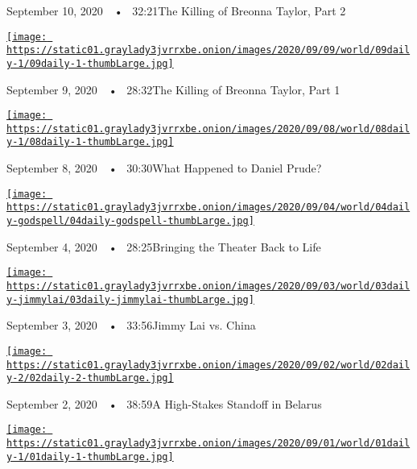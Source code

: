 September 10, 2020~~•~ 32:21The Killing of Breonna Taylor, Part 2

\href{https://www.nytimes3xbfgragh.onion/2020/09/09/podcasts/the-daily/breonna-taylor.html?action=click\&module=audio-series-bar\&region=header\&pgtype=Article}{\texttt{[image: https://static01.graylady3jvrrxbe.onion/images/2020/09/09/world/09daily-1/09daily-1-thumbLarge.jpg]}}

September 9, 2020~~•~ 28:32The Killing of Breonna Taylor, Part 1

\href{https://www.nytimes3xbfgragh.onion/2020/09/08/podcasts/the-daily/Daniel-Prude-BLM-police.html?action=click\&module=audio-series-bar\&region=header\&pgtype=Article}{\texttt{[image: https://static01.graylady3jvrrxbe.onion/images/2020/09/08/world/08daily-1/08daily-1-thumbLarge.jpg]}}

September 8, 2020~~•~ 30:30What Happened to Daniel Prude?

\href{https://www.nytimes3xbfgragh.onion/2020/09/04/podcasts/the-daily/Godspell-theater-coronavirus.html?action=click\&module=audio-series-bar\&region=header\&pgtype=Article}{\texttt{[image: https://static01.graylady3jvrrxbe.onion/images/2020/09/04/world/04daily-godspell/04daily-godspell-thumbLarge.jpg]}}

September 4, 2020~~•~ 28:25Bringing the Theater Back to Life

\href{https://www.nytimes3xbfgragh.onion/2020/09/03/podcasts/the-daily/hong-kong-china-jimmy-lai.html?action=click\&module=audio-series-bar\&region=header\&pgtype=Article}{\texttt{[image: https://static01.graylady3jvrrxbe.onion/images/2020/09/03/world/03daily-jimmylai/03daily-jimmylai-thumbLarge.jpg]}}

September 3, 2020~~•~ 33:56Jimmy Lai vs. China

\href{https://www.nytimes3xbfgragh.onion/2020/09/02/podcasts/the-daily/belarus-protests-lukashenko.html?action=click\&module=audio-series-bar\&region=header\&pgtype=Article}{\texttt{[image: https://static01.graylady3jvrrxbe.onion/images/2020/09/02/world/02daily-2/02daily-2-thumbLarge.jpg]}}

September 2, 2020~~•~ 38:59A High-Stakes Standoff in Belarus

\href{https://www.nytimes3xbfgragh.onion/2020/09/01/podcasts/the-daily/joe-biden-protests-trump.html?action=click\&module=audio-series-bar\&region=header\&pgtype=Article}{\texttt{[image: https://static01.graylady3jvrrxbe.onion/images/2020/09/01/world/01daily-1/01daily-1-thumbLarge.jpg]}}

